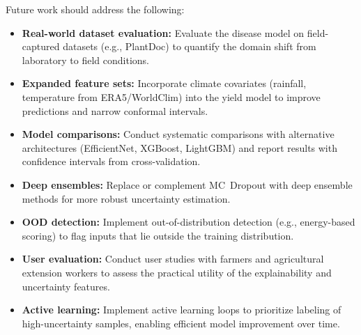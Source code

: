 \documentclass[conference]{IEEEtran}
\begin{document}
Future work should address the following:
\begin{itemize}[leftmargin=*]
  \item \textbf{Real-world dataset evaluation:} Evaluate the disease model on field-captured datasets (e.g., PlantDoc) to quantify the domain shift from laboratory to field conditions.
  \item \textbf{Expanded feature sets:} Incorporate climate covariates (rainfall, temperature from ERA5/WorldClim) into the yield model to improve predictions and narrow conformal intervals.
  \item \textbf{Model comparisons:} Conduct systematic comparisons with alternative architectures (EfficientNet, XGBoost, LightGBM) and report results with confidence intervals from cross-validation.
  \item \textbf{Deep ensembles:} Replace or complement MC~Dropout with deep ensemble methods for more robust uncertainty estimation.
  \item \textbf{OOD detection:} Implement out-of-distribution detection (e.g., energy-based scoring) to flag inputs that lie outside the training distribution.
  \item \textbf{User evaluation:} Conduct user studies with farmers and agricultural extension workers to assess the practical utility of the explainability and uncertainty features.
  \item \textbf{Active learning:} Implement active learning loops to prioritize labeling of high-uncertainty samples, enabling efficient model improvement over time.
\end{itemize}

\balance


\end{document}
